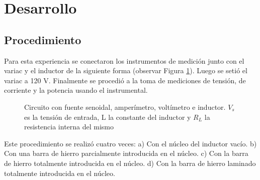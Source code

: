 \documentclass{article}
\begin{document}
    \indent
    \section{Desarrollo}

        \subsection{Procedimiento}

            Para esta experiencia se conectaron los instrumentos de medición junto con el variac y el inductor de la
             siguiente forma (observar Figura \ref{fig:circuito-inductor}). Luego se setió el variac a 120 V. 
             Finalmente se procedió a la toma de mediciones de tensión, de corriente y la potencia usando el 
             instrumental. 
            \begin{figure}[h!]
                \centering
                \caption{Circuito con fuente senoidal, amperímetro, voltímetro e inductor. $V_s$ es la tensión de entrada,
                 L la constante del inductor y $R_L$ la resistencia interna del mismo}
                \label{fig:circuito-inductor}
            \end{figure}

            Este procedimiento se realizó cuatro veces: a) Con el núcleo del inductor vacío. b) 
            Con una barra de hierro parcialmente introducida en el núcleo. c) Con la barra de hierro
             totalmente introducida 
            en el núcleo. d) Con la barra de hierro laminado totalmente introducida 
            en el núcleo.
\end{document}

